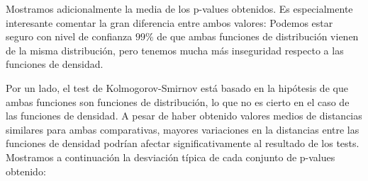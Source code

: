 \documentclass[a4paper]{article}
\begin{document}
\begin{enumerate}[a)]
Mostramos adicionalmente la media de los p-values obtenidos. Es especialmente interesante comentar la gran diferencia entre ambos valores: Podemos estar seguro con nivel de confianza $99\%$ de que ambas funciones de distribución vienen de la misma distribución, pero tenemos mucha más inseguridad respecto a las funciones de densidad.

Por un lado, el test de Kolmogorov-Smirnov está basado en la hipótesis de que ambas funciones son funciones de distribución, lo que no es cierto en el caso de las funciones de densidad. A pesar de haber obtenido valores medios de distancias similares para ambas comparativas, mayores variaciones en la distancias entre las funciones de densidad podrían afectar significativamente al resultado de los tests. Mostramos a continuación la desviación típica de cada conjunto de p-values obtenido:


	
\end{enumerate}
\end{document}
